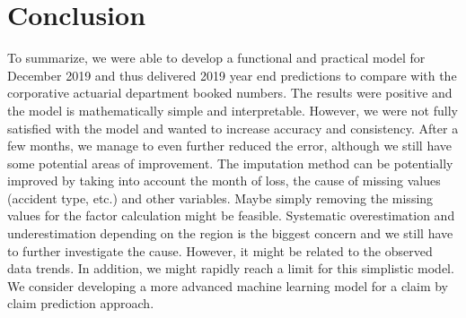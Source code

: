 \section{Conclusion}\label{Sect_Conclusion}
To summarize, we were able to develop a functional and practical model for December 2019 and thus delivered 2019 year end predictions to compare with the corporative actuarial department booked numbers. The results were positive and the model is mathematically simple and interpretable. However, we were not fully satisfied with the model and wanted to increase accuracy and consistency. After a few months, we manage to even further reduced the error, although we still have some potential areas of improvement. The imputation method can be potentially improved by taking into account the month of loss, the cause of missing values (accident type, etc.) and other variables. Maybe simply removing the missing values for the factor calculation might be feasible. Systematic overestimation and underestimation depending on the region is the biggest concern and we still have to further investigate the cause. However, it might be related to the observed data trends.
In addition, we might rapidly reach a limit for this simplistic model. We consider developing a more advanced machine learning model for a claim by claim prediction approach.